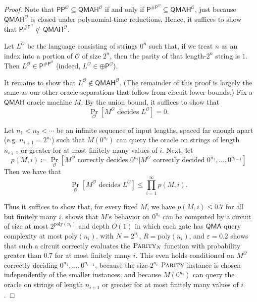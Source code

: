 \documentclass[10pt,a4paper]{article}
\newcommand{\eps}{\varepsilon}
\newcommand{\poly}{\mathrm{poly}}
\newcommand{\PARITY}{\normalfont\textsc{Parity}}
\begin{document}
\begin{proof}[Proof]
Note that $\mathsf{PP}^\mathcal{O} \subseteq \mathsf{QMAH}^\mathcal{O}$ if and only if $\mathsf{P}^{\mathsf{\# P}^\mathcal{O}} \subseteq \mathsf{QMAH}^\mathcal{O}$, just because $\mathsf{QMAH}^\mathcal{O}$ is closed under polynomial-time reductions. Hence, it suffices to show that $\mathsf{P}^{\mathsf{\# P}^\mathcal{O}} \not\subset \mathsf{QMAH}^\mathcal{O}$.

Let $L^\mathcal{O}$ be the language consisting of strings $0^n$ such that, if we treat $n$ as an index into a portion of $\mathcal{O}$ of size $2^n$, then the parity of that length-$2^n$ string is $1$. Then $L^\mathcal{O} \in \mathsf{P}^{\mathsf{\# P}^\mathcal{O}}$ (indeed, $L^\mathcal{O} \in \mathsf{\oplus P}^\mathcal{O}$).

It remains to show that $L^\mathcal{O} \not\in \mathsf{QMAH}^\mathcal{O}$. (The remainder of this proof is largely the same as our other oracle separations that follow from circuit lower bounds.) Fix a $\mathsf{QMAH}$ oracle machine $M$. By the union bound, it suffices to show that
\[
\Pr_{\mathcal{O}}\left[M^\mathcal{O} \text{ decides } L^\mathcal{O}\right]=0.
\]

Let $n_1<n_2<\cdots$ be an infinite sequence of input lengths, spaced far enough apart (e.g. $n_{i+1}=2^{n_i}$) such that $M\left(0^{n_i}\right)$ can query the oracle on strings of length $n_{i+1}$ or greater for at most finitely many values of $i$. Next, let
\[
p(M,i)\coloneqq\Pr_{\mathcal{O}}\left[M^\mathcal{O} \text{ correctly decides } 0^{n_i}|M^\mathcal{O} \text{ correctly decided }0^{n_1},\dots,0^{n_{i-1}}\right]
\]
Then we have that
\[
\Pr_{\mathcal{O}}\left[M^\mathcal{O}\text{ decides }L^\mathcal{O}\right]\leq\prod_{i=1}^\infty p(M,i).
\]

\noindent Thus it suffices to show that, for every fixed $M$, we have $p(M,i)\leq 0.7$ for all but finitely many $i$.  shows that $M$'s behavior on $0^{n_i}$ can be computed by a circuit of size at most $2^{\poly(n_i)}$ and depth $O(1)$ in which each gate has $\mathsf{QMA}$ query complexity at most $\poly(n_i)$.  with $N = 2^{n_i}$, $R = \poly(n_i)$, and $\eps = 0.2$ shows that such a circuit correctly evaluates the $\PARITY_N$ function with probability greater than $0.7$ for at most finitely many $i$. This even holds conditioned on $M^\mathcal{O}$ correctly deciding $0^{n_1},\ldots,0^{n_{i-1}}$, because the size-$2^{n_i}$ $\PARITY$ instance is chosen independently of the smaller instances, and because $M\left(0^{n_i}\right)$ can query the oracle on strings of length $n_{i+1}$ or greater for at most finitely many values of $i$.
\end{proof}
\end{document}
